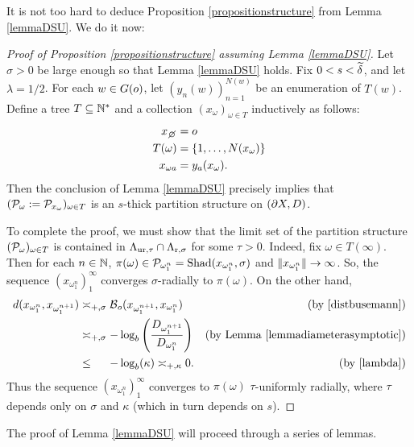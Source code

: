 It is not too hard to deduce Proposition \ref{propositionstructure} from Lemma \ref{lemmaDSU}. We do it now:
\begin{proof}[Proof of Proposition \ref{propositionstructure} assuming Lemma \ref{lemmaDSU}]
Let $\sigma > 0$ be large enough so that Lemma \ref{lemmaDSU} holds. Fix $0 < s < \widetilde\delta$, and let $\lambda = 1/2$. For each $w\in G(o)$, let $(y_n(w))_{n = 1}^{N(w)}$ be an enumeration of $T(w)$. Define a tree $T\subset\N^*$ and a collection $(x_\omega)_{\omega\in T}$ inductively as follows:
\begin{align*}
x_\smallemptyset &= \zero\\
T(\omega) &= \{1,\ldots,N(x_\omega)\}\\
x_{\omega a} &= y_a(x_\omega).
\end{align*}
Then the conclusion of Lemma \ref{lemmaDSU} precisely implies that $(\mathcal P_\omega := \mathcal P_{x_\omega})_{\omega\in T}$ is an $s$-thick partition structure on $(\partial X,D)$.

To complete the proof, we must show that the limit set of the partition structure $(\mathcal P_\omega)_{\omega\in T}$ is contained in $\Lambda_{\mathrm{ur},\tau}\cap\Lambda_{\mathrm r,\sigma}$ for some $\tau > 0$. Indeed, fix $\omega\in T(\infty)$. Then for each $n\in\N$, $\pi(\omega)\in \mathcal P_{\omega_1^n}=\operatorname{Shad}(x_{\omega_1^n},\sigma)$ and $\|x_{\omega_1^n}\|\to \infty$. So, the sequence $(x_{\omega_1^n})_1^\infty$ converges $\sigma$-radially to $\pi(\omega)$. On the other hand,
\begin{align*}
\dist(x_{\omega_1^n},x_{\omega_1^{n + 1}}) &\asymp_{\plus,\sigma} \busemann_\zero(x_{\omega_1^{n + 1}},x_{\omega_1^n}) \by{\eqref{distbusemann}}\\
&\asymp_{\plus,\sigma} -\log_b\left(\frac{D_{\omega_1^{n + 1}}}{D_{\omega_1^n}}\right) \by{Lemma \ref{lemmadiameterasymptotic}}\\
&\leq_{\phantom{\plus,\sigma}} -\log_b(\kappa) \asymp_{\plus,\kappa} 0. \by {\eqref{lambda}}
\end{align*}
Thus the sequence $(x_{\omega_1^n})_1^\infty$ converges to $\pi(\omega)$ $\tau$-uniformly radially, where $\tau$ depends only on $\sigma$ and $\kappa$ (which in turn depends on $s$).
\end{proof}


The proof of Lemma \ref{lemmaDSU} will proceed through a series of lemmas.



